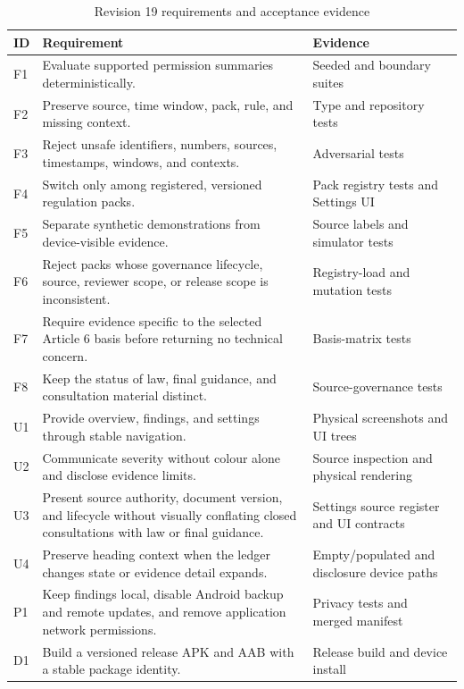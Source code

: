 \begin{table}[H]
\centering
\small
\caption{Revision 19 requirements and acceptance evidence}
\label{tab:r18-requirements}
\begin{tabular}{p{}p{}p{}}
\toprule
ID & Requirement & Evidence \\
\midrule
F1 & Evaluate supported permission summaries deterministically. & Seeded and boundary suites \\
F2 & Preserve source, time window, pack, rule, and missing context. & Type and repository tests \\
F3 & Reject unsafe identifiers, numbers, sources, timestamps, windows, and contexts. & Adversarial tests \\
F4 & Switch only among registered, versioned regulation packs. & Pack registry tests and Settings UI \\
F5 & Separate synthetic demonstrations from device-visible evidence. & Source labels and simulator tests \\
F6 & Reject packs whose governance lifecycle, source, reviewer scope, or release scope is inconsistent. & Registry-load and mutation tests \\
F7 & Require evidence specific to the selected Article 6 basis before returning no technical concern. & Basis-matrix tests \\
F8 & Keep the status of law, final guidance, and consultation material distinct. & Source-governance tests \\
U1 & Provide overview, findings, and settings through stable navigation. & Physical screenshots and UI trees \\
U2 & Communicate severity without colour alone and disclose evidence limits. & Source inspection and physical rendering \\
U3 & Present source authority, document version, and lifecycle without visually conflating closed consultations with law or final guidance. & Settings source register and UI contracts \\
U4 & Preserve heading context when the ledger changes state or evidence detail expands. & Empty/populated and disclosure device paths \\
P1 & Keep findings local, disable Android backup and remote updates, and remove application network permissions. & Privacy tests and merged manifest \\
D1 & Build a versioned release APK and AAB with a stable package identity. & Release build and device install \\
\bottomrule
\end{tabular}
\end{table}

